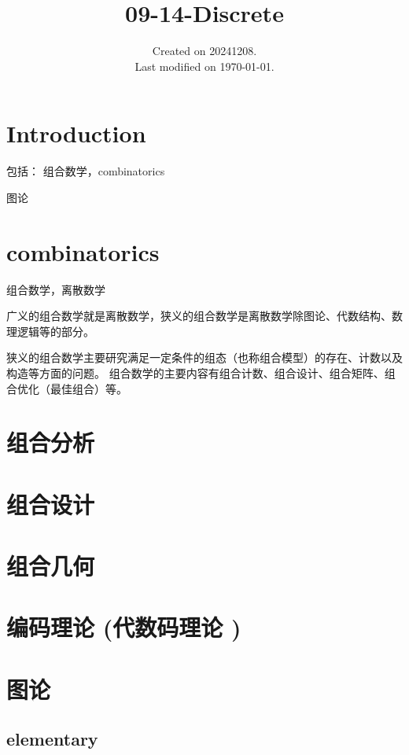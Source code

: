 \documentclass[UTF8]{../09-Mathematics}
\begin{document}
\title{09-14-Discrete}
\date{Created on 20241208.\\   Last modified on \today.}
\maketitle
\tableofcontents






\chapter{Introduction}

包括：
组合数学，combinatorics

图论


\chapter{combinatorics}
组合数学，离散数学

广义的组合数学就是离散数学，狭义的组合数学是离散数学除图论、代数结构、数理逻辑等的部分。

狭义的组合数学主要研究满足一定条件的组态（也称组合模型）的存在、计数以及构造等方面的问题。 组合数学的主要内容有组合计数、组合设计、组合矩阵、组合优化（最佳组合）等。


\chapter{组合分析}
\chapter{组合设计}
\chapter{组合几何}
\chapter{编码理论 (代数码理论 )}



\chapter{图论}


\section{elementary}
\end{document}
